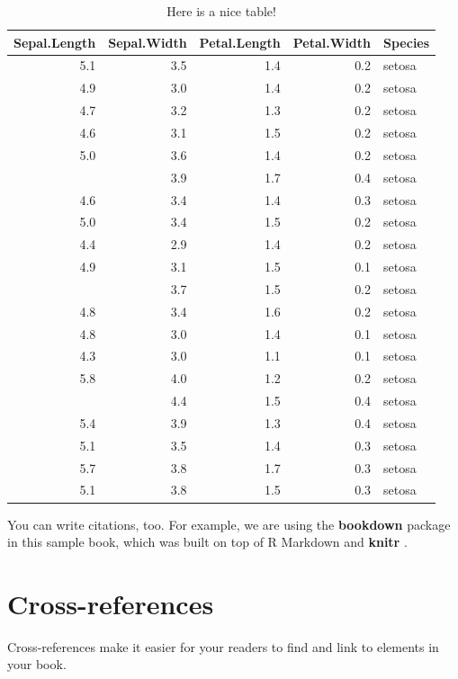 \documentclass[
]{book}
\theoremstyle{definition}
\theoremstyle{definition}
\theoremstyle{definition}
\theoremstyle{definition}
\theoremstyle{remark}
\begin{document}
\begin{table}

\caption{\label{tab:nice-tab2}Here is a nice table!}
\centering
\begin{tabular}[t]{rrrrl}
\toprule
Sepal.Length & Sepal.Width & Petal.Length & Petal.Width & Species\\
\midrule
5.1 & 3.5 & 1.4 & 0.2 & setosa\\
4.9 & 3.0 & 1.4 & 0.2 & setosa\\
4.7 & 3.2 & 1.3 & 0.2 & setosa\\
4.6 & 3.1 & 1.5 & 0.2 & setosa\\
5.0 & 3.6 & 1.4 & 0.2 & setosa\\
\addlinespace
5.4 & 3.9 & 1.7 & 0.4 & setosa\\
4.6 & 3.4 & 1.4 & 0.3 & setosa\\
5.0 & 3.4 & 1.5 & 0.2 & setosa\\
4.4 & 2.9 & 1.4 & 0.2 & setosa\\
4.9 & 3.1 & 1.5 & 0.1 & setosa\\
\addlinespace
5.4 & 3.7 & 1.5 & 0.2 & setosa\\
4.8 & 3.4 & 1.6 & 0.2 & setosa\\
4.8 & 3.0 & 1.4 & 0.1 & setosa\\
4.3 & 3.0 & 1.1 & 0.1 & setosa\\
5.8 & 4.0 & 1.2 & 0.2 & setosa\\
\addlinespace
5.7 & 4.4 & 1.5 & 0.4 & setosa\\
5.4 & 3.9 & 1.3 & 0.4 & setosa\\
5.1 & 3.5 & 1.4 & 0.3 & setosa\\
5.7 & 3.8 & 1.7 & 0.3 & setosa\\
5.1 & 3.8 & 1.5 & 0.3 & setosa\\
\bottomrule
\end{tabular}
\end{table}

You can write citations, too. For example, we are using the \textbf{bookdown} package \citep{R-bookdown} in this sample book, which was built on top of R Markdown and \textbf{knitr} \citep{xie2015}.

\hypertarget{cross}{%
\chapter{Cross-references}\label{cross}}

Cross-references make it easier for your readers to find and link to elements in your book.
\end{document}
